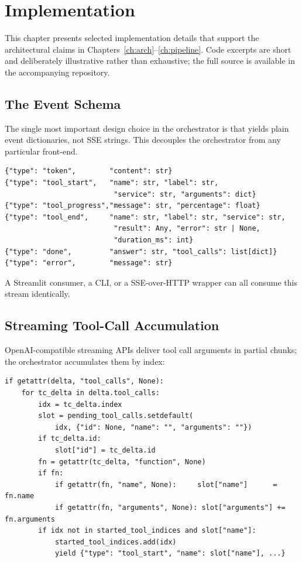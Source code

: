 \chapter{Implementation}
\label{ch:impl}

This chapter presents selected implementation details that support
the architectural claims in Chapters~\ref{ch:arch}--\ref{ch:pipeline}.
Code excerpts are short and deliberately illustrative rather than
exhaustive; the full source is available in the accompanying
repository.

\section{The Event Schema}
\label{sec:event-schema}

The single most important design choice in the orchestrator is that
 yields plain event dictionaries, not SSE strings.
This decouples the orchestrator from any particular front-end.

\begin{lstlisting}[caption={Event dictionary shapes emitted by
\code{orchestrator/loop.py::stream\_chat}.},
label={lst:events}]
{"type": "token",        "content": str}
{"type": "tool_start",   "name": str, "label": str,
                          "service": str, "arguments": dict}
{"type": "tool_progress","message": str, "percentage": float}
{"type": "tool_end",     "name": str, "label": str, "service": str,
                          "result": Any, "error": str | None,
                          "duration_ms": int}
{"type": "done",         "answer": str, "tool_calls": list[dict]}
{"type": "error",        "message": str}
\end{lstlisting}

A Streamlit consumer, a CLI, or a SSE-over-HTTP wrapper can all
consume this stream identically.

\section{Streaming Tool-Call Accumulation}
\label{sec:tool-accum}

OpenAI-compatible streaming APIs deliver tool call arguments in
partial chunks; the orchestrator accumulates them by index:

\begin{lstlisting}[caption={Argument accumulation loop (extract).},
label={lst:accum}]
if getattr(delta, "tool_calls", None):
    for tc_delta in delta.tool_calls:
        idx = tc_delta.index
        slot = pending_tool_calls.setdefault(
            idx, {"id": None, "name": "", "arguments": ""})
        if tc_delta.id:
            slot["id"] = tc_delta.id
        fn = getattr(tc_delta, "function", None)
        if fn:
            if getattr(fn, "name", None):     slot["name"]      = fn.name
            if getattr(fn, "arguments", None): slot["arguments"] += fn.arguments
        if idx not in started_tool_indices and slot["name"]:
            started_tool_indices.add(idx)
            yield {"type": "tool_start", "name": slot["name"], ...}
\end{lstlisting}

